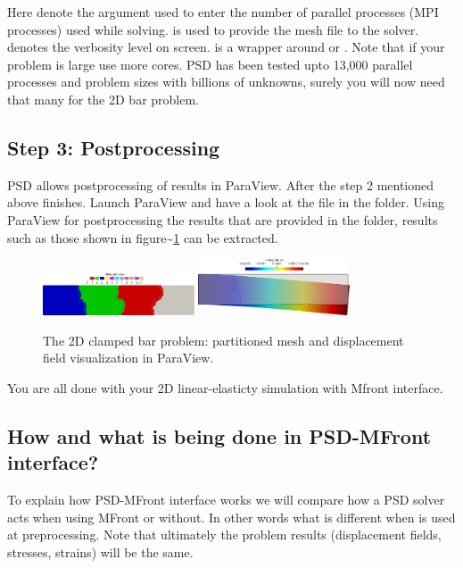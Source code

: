 Here  denote the argument used to enter the number of
parallel processes (MPI processes) used while solving.
 is used to provide the mesh file to
the solver.  denotes the verbosity level on screen.
 is a wrapper around  or
. Note that if your problem is large use more cores.
PSD has been tested upto 13,000 parallel processes and problem sizes
with billions of unknowns, surely you will now need that many for the 2D
bar problem.

\subsection{Step 3: Postprocessing}

PSD allows postprocessing of results in ParaView. After the step 2
mentioned above finishes. Launch ParaView and have a look at the
 file in the  folder. Using ParaView for
postprocessing the results that are provided in the 
folder, results such as those shown in
figure\textasciitilde{}\ref{bar-le-full} can be extracted.

\begin{figure}[h!]
\centering
\includegraphics[align=t,width=0.4\textwidth]{./Images/le-2d-bar-partioned.png}\hfill
\includegraphics[align=t,width=0.4\textwidth]{./Images/le-2d-bar-results.png}
\caption{The 2D clamped bar problem: partitioned mesh and displacement field visualization in ParaView. \label{bar-le-full}}
\end{figure}

You are all done with your 2D linear-elasticty simulation with Mfront
interface.

\subsection{How and what is being done in PSD-MFront interface? }

To explain how PSD-MFront interface works we will compare how a PSD
solver acts when using MFront or without. In other words what is
different when  is used at preprocessing. Note that
ultimately the problem results (displacement fields, stresses, strains)
will be the same.


